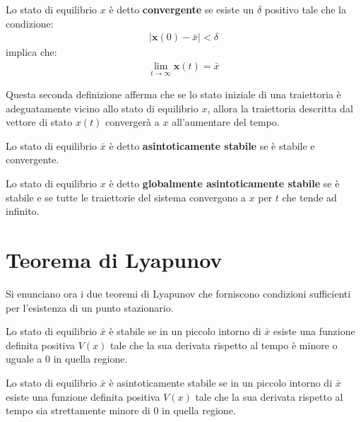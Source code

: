 \begin{mydef}
	Lo stato di equilibrio $x$ è detto \textbf{convergente} se esiste un $\delta$ positivo tale che la
	condizione:
	\begin{align*}
		\left|\mathbf{x}(0) - \bar{x} \right| < \delta
	\end{align*}
	implica che:
	\begin{align*}
		\lim_{t \rightarrow \infty} \mathbf{x}(t) = \bar{x}
	\end{align*}
\end{mydef}
Questa seconda definizione afferma che se lo stato iniziale di una traiettoria è adeguatamente vicino allo stato di equilibrio $x$, allora la traiettoria descritta dal vettore di stato $x(t)$ convergerà a $x$ all'aumentare del tempo.
\begin{mydef}
	Lo stato di equilibrio $\bar{x}$ è detto \textbf{asintoticamente stabile} se è stabile e convergente.
\end{mydef}
\begin{mydef}
	Lo stato di equilibrio $x$ è detto \textbf{globalmente asintoticamente stabile} se è stabile e se
	tutte le traiettorie del sistema convergono a $x$ per $t$ che tende ad infinito.
\end{mydef}

\newpage


\section{Teorema di Lyapunov} %
\label{sub:teorema_di_lyapunov}
Si enunciano ora i due teoremi di Lyapunov che forniscono condizioni sufficienti per l'esistenza di un punto stazionario.

\begin{thm}
	Lo stato di equilibrio $\bar{x}$ è stabile se in un piccolo intorno di $\bar{x}$ esiste una funzione definita positiva $V(x)$ tale che la sua derivata rispetto al tempo è minore o uguale a 0 in quella regione.
\end{thm}

\begin{thm}
	Lo stato di equilibrio $\bar{x}$ è asintoticamente stabile se in un piccolo intorno di $\bar{x}$ esiste una funzione definita positiva $V(x)$ tale che la sua derivata rispetto al tempo sia strettamente minore di 0 in quella regione.
\end{thm}

